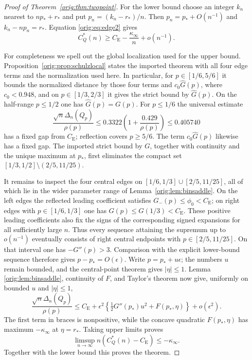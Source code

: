 \documentclass[11pt,a4paper]{article}
\numberwithin{equation}{section}
\theoremstyle{definition}
\theoremstyle{remark}
\newcommand{\CE}{C_{\mathrm E}}
\begin{document}
\begin{proof}[Proof of Theorem~\ref{orig:thm:twopoint}]
For the lower bound choose an integer $k_n$ nearest to $np_*+r_*$ and put
$p_n=(k_n-r_*)/n$.  Then $p_n=p_*+O(n^{-1})$ and
$k_n-np_n=r_*$.  Equation \eqref{orig:eq:edge2} gives
\[
 C_Q^*(n)\ge \CE-\frac{\kappa_\infty}{n}+o(n^{-1}).
\]

For completeness we spell out the global localization used for the upper
bound.  Proposition~\ref{orig:prop:schulzlocal} states the imported theorem with
all four edge terms and the normalization used here.  In particular, for
$p\in[1/6,5/6]$ it bounds the normalized distance by those four terms and
$c_0\widehat G(p)$, where $c_0<0.948$, and on
$p\in[1/3,2/3]$ it gives the strict bound by $\widehat G(p)$.  On the
half-range $p\le1/2$ one has $\widehat G(p)=G(p)$.  For $p\le1/6$ the
universal estimate
\cite{Shevtsova2013}
\[
 \frac{\sqrt n\Delta_n(Q_p)}{\rho(p)}
 \le0.3322\left(1+\frac{0.429}{\rho(p)}\right)
 \le0.405740
\]
has a fixed gap from $\CE$; reflection covers $p\ge5/6$.  The term
$c_0\widehat G(p)$ likewise has a fixed gap.  The imported strict bound by $G$,
together with continuity and the unique maximum at $p_*$, first eliminates
the compact set $[1/3,1/2]\setminus(2/5,11/25)$.

It remains to inspect the four central edges on
$[1/6,1/3]\cup[2/5,11/25]$, all of which lie in the wider parameter range
of Lemma~\ref{orig:lem:binsaddle}.  On the left edges the reflected leading
coefficient satisfies $G_-(p)\le\phi_0<\CE$; on right edges with
$p\in[1/6,1/3]$ one has $G(p)\le G(1/3)<\CE$.  These positive leading
coefficients also fix the signs of the corresponding signed expansions for
all sufficiently large $n$.  Thus every sequence attaining the supremum up
to $o(n^{-1})$ eventually consists of right central endpoints with
$p\in[2/5,11/25]$.  On that interval one has
$-G''(p)>3$.  Comparison with the explicit lower-bound sequence therefore gives
$p-p_*=O(\epsilon)$.  Write $p=p_*+u\epsilon$; the numbers $u$ remain
bounded, and the central-point theorem gives $|\eta|\le1$.  Lemma
\ref{orig:lem:binsaddle}, continuity of $F$, and Taylor's theorem now give,
uniformly on bounded $u$ and $|\eta|\le1$,
\[
 \frac{\sqrt n\Delta_n(Q_p)}{\rho(p)}
 \le \CE+\epsilon^2
 \left\{\tfrac12G''(p_*)u^2+F(p_*,\eta)\right\}+o(\epsilon^2).
\]
The first term in braces is nonpositive, while the concave quadratic
$F(p_*,\eta)$ has maximum $-\kappa_\infty$ at $\eta=r_*$.  Taking upper
limits proves
\[
 \limsup_{n\to\infty}n(C_Q^*(n)-\CE)\le-\kappa_\infty.
\]
Together with the lower bound this proves the theorem.
\end{proof}
\end{document}
